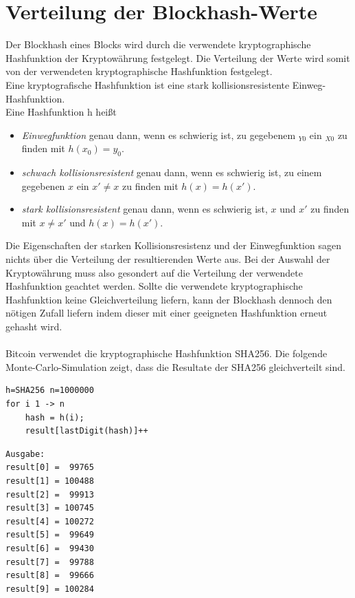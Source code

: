 \section{Verteilung der Blockhash-Werte}\label{btc_distribution}
Der Blockhash eines Blocks wird durch die verwendete kryptographische Hashfunktion der Kryptowährung festgelegt. Die Verteilung der Werte wird somit von der verwendeten kryptographische Hashfunktion festgelegt.\\
Eine kryptografische Hashfunktion ist eine stark kollisionsresistente Einweg-Hashfunktion.\\
Eine Hashfunktion h heißt
\begin{itemize}
\item \textit{Einwegfunktion} genau dann, wenn es schwierig ist, zu gegebenem $_{Y0}$ ein $_{X0}$ zu finden mit $h(x_{0}) = y_{0}$.
\item \textit{schwach kollisionsresistent} genau dann, wenn es schwierig ist, zu einem gegebenen $x$ ein $x' \neq x$ zu finden mit $h(x) = h(x')$.
\item \emph{stark kollisionsresistent} genau dann, wenn es schwierig ist, $x$ und $x'$ zu finden
mit $x \neq x'$ und $h(x) = h(x')$.
\end{itemize}Die Eigenschaften der starken Kollisionsresistenz und der Einwegfunktion sagen nichts über die Verteilung der resultierenden Werte aus. Bei der Auswahl der Kryptowährung muss also gesondert auf die Verteilung der verwendete Hashfunktion geachtet werden. Sollte die verwendete kryptographische Hashfunktion keine Gleichverteilung liefern, kann der Blockhash dennoch den nötigen Zufall liefern indem dieser mit einer geeigneten Hashfunktion erneut gehasht wird.\\\\
Bitcoin verwendet die kryptographische Hashfunktion SHA256.
Die folgende Monte-Carlo-Simulation zeigt, dass die Resultate der SHA256 gleichverteilt sind.
\begin{verbatim}
h=SHA256 n=1000000
for i 1 -> n
    hash = h(i);
    result[lastDigit(hash)]++
\end{verbatim}
\begin{minipage}{0.5\textwidth}
\begin{verbatim}
Ausgabe:
result[0] =  99765
result[1] = 100488
result[2] =  99913
result[3] = 100745
result[4] = 100272
result[5] =  99649
result[6] =  99430
result[7] =  99788
result[8] =  99666
result[9] = 100284
\end{verbatim}
\end{minipage}
